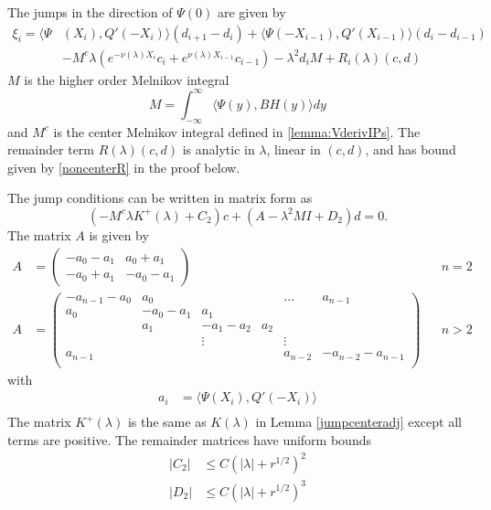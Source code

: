 \documentclass[thesis.tex]{subfiles}
\begin{document}
\begin{lemma}\label{jumpadj}
The jumps in the direction of $\Psi(0)$ are given by
\begin{equation}\label{jumpPsi0}
\begin{aligned}
\xi_i = \langle \Psi&(X_i), Q'(-X_i) \rangle (d_{i+1} - d_i ) + \langle \Psi(-X_{i-1}), Q'(X_{i-1}) \rangle (d_i - d_{i-1} ) \\
&- M^c \lambda( e^{-\nu(\lambda)X_i}c_i + e^{\nu(\lambda)X_{i-1}}c_{i-1})
- \lambda^2 d_i M + R_i(\lambda)(c, d)
\end{aligned}
\end{equation}
$M$ is the higher order Melnikov integral
\begin{equation}\label{defM2}
M = \int_{-\infty}^\infty \langle \Psi(y), B H(y) \rangle dy
\end{equation}
and $M^c$ is the center Melnikov integral defined in \cref{lemma:VderivIPs}. The remainder term $R(\lambda)(c, d)$ is analytic in $\lambda$, linear in $(c, d)$, and has bound given by \cref{noncenterR} in the proof below. 

The jump conditions can be written in matrix form as
\begin{equation}
(- M^c \lambda K^+(\lambda) + C_2 )c + (A - \lambda^2 M I + D_2)d = 0.
\end{equation}
The matrix $A$ is given by
\begin{align*}
A &= \begin{pmatrix}
-a_0 -a_1 & a_0 + a_1 \\
-a_0 + a_1 & -a_0 - a_1
\end{pmatrix} && n = 2 \\
A &= \begin{pmatrix}
-a_{n-1} - a_0 & a_0 & & & \dots & a_{n-1}\\
a_0 & -a_0 - a_1 &  a_1 \\
& a_1 & -a_1 - a_2 &  a_2 \\
& & \vdots & & \vdots \\
a_{n-1} & & & & a_{n-2} & -a_{n-2} - a_{n-1} \\
\end{pmatrix} && n > 2
\end{align*}
with
\begin{align*}
a_i &= \langle \Psi(X_i), Q'(-X_i) \rangle \\
\end{align*}
The matrix $K^+(\lambda)$ is the same as $K(\lambda)$ in Lemma \ref{jumpcenteradj} except all terms are positive. The remainder matrices have uniform bounds
\begin{align}\label{adjjumprem}
|C_2| &\leq C (|\lambda| + r^{1/2})^2 \\
|D_2| &\leq C (|\lambda| + r^{1/2})^3 
\end{align}


\end{lemma}
\end{document}
